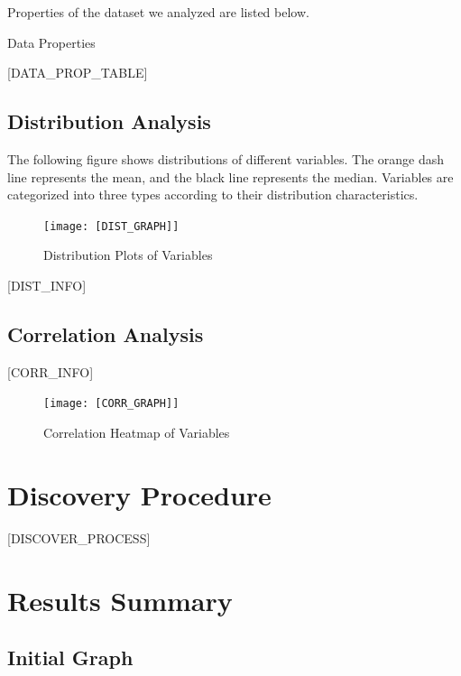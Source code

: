 \documentclass{article}
\begin{document}
Properties of the dataset we analyzed are listed below.

\begin{table}[H]
    \centering
    \caption{Data Properties}
[DATA_PROP_TABLE]
\end{table}


\subsection{Distribution Analysis}
The following figure shows distributions of different variables. The orange dash line represents the mean, 
and the black line represents the median. Variables are categorized into three types according to their distribution characteristics.

\begin{figure}[H]
\centering
\texttt{[image: [DIST\_GRAPH]]}
\caption{\label{fig:dist}Distribution Plots of Variables}
\end{figure}

[DIST_INFO]

\subsection{Correlation Analysis}

\begin{minipage}[t]{0.5\linewidth}
    [CORR_INFO]
\vfill
\end{minipage}
\hfill
\begin{minipage}[t]{0.5\linewidth}
    \begin{figure}[H]
        \centering
        \vspace{-1.5cm}
        \texttt{[image: [CORR\_GRAPH]]}
        \caption{\label{fig:corr}Correlation Heatmap of Variables}
    \end{figure}
\end{minipage}

\section{Discovery Procedure}
[DISCOVER_PROCESS]

\section{Results Summary}

\subsection{Initial Graph}
\end{document}

